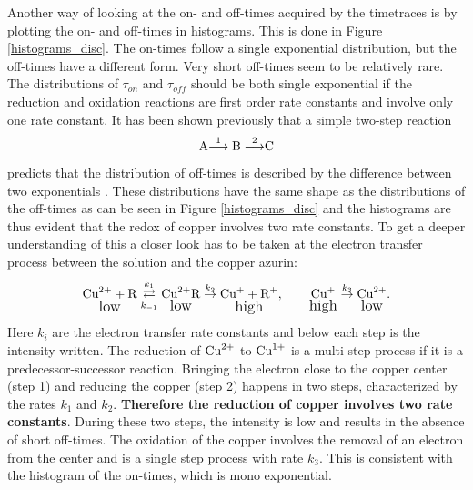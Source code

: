\documentclass[twoside,single]{lion-msc}
\begin{document}
Another way of looking at the on- and off-times acquired by the timetraces is by plotting the on- and off-times in histograms. This is done in Figure \ref{histograms_disc}. The on-times follow a single exponential distribution, but the off-times have a different form. Very short off-times seem to be relatively rare. The distributions of  $\tau_{on}$ and  $\tau_{off}$ should be both single exponential if the reduction and oxidation reactions are first order rate constants and involve only one rate constant. It has been shown previously that a simple two-step reaction
\begin{equation}\label{ox_pros}
\textup{A}{\overset{1}{\longrightarrow}\textup{B}\overset{2}{\longrightarrow}}\textup{C}
\end{equation}
predicts that the distribution of off-times is described by the difference between two exponentials \cite{Smiley2006}. These distributions have the same shape as the distributions of the off-times as can be seen in Figure \ref{histograms_disc} and the histograms are thus evident that the redox of copper involves two rate constants. To get a deeper understanding of this a closer look has to be taken at the electron transfer process between the solution and the copper azurin:
\begin{equation}\label{ox_pros}
\underset{\textup{\large low}}{\textup{Cu}^{2+} + \textup{R}} \overset{k_{1}}{\underset{k_{-1}}\rightleftarrows} \underset{\textup{\large low}}{\textup{Cu}^{2+}\textup{R}} \overset{k_{2}}\rightarrow \underset{\textup{\large high}}{\textup{Cu}^{+} + \textup{R}^{+}},  \qquad \underset{\textup{\large high}}{\textup{Cu}^{+}} \overset{k_{3}}\rightarrow \underset{\textup{\large low}}{\textup{Cu}^{2+}}.
\end{equation}
Here $k_{i}$ are the electron transfer rate constants and below each step is the intensity written. The reduction of $\textup{Cu}^{2+}$ to $\textup{Cu}^{1+}$ is a multi-step process if it is a predecessor-successor reaction. Bringing the electron close to the copper center (step 1) and reducing the copper (step 2) happens in two steps, characterized by the rates $k_{1}$ and $k_{2}$. \textbf{Therefore the reduction of copper involves two rate constants}. During these two steps, the intensity is low and results in the absence of short off-times. The oxidation of the copper  involves the removal of an electron from the center and is a single step process with rate $k_{3}$. This is consistent with the histogram of the on-times, which is mono exponential.
\end{document}
